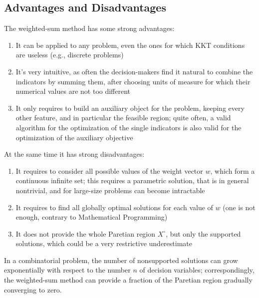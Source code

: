 \subsection{Advantages and Disadvantages}
\label{subsec:wsprocons}

The weighted-sum method has some strong advantages: 
\begin{enumerate}
	\item It can be applied to any problem, even the ones for which KKT conditions are useless (e.g., discrete problems)
	
	\item It's very intuitive, as often the decision-makers find it natural to combine the indicators by summing them, after choosing units of measure for which their numerical values are not too different
	
	\item It only requires to build an auxiliary object for the problem, keeping every other feature, and in particular the feasible region; quite often, a valid algorithm for the optimization of the single indicators is also valid for the optimization of the auxiliary objective
\end{enumerate}

At the same time it has strong disadvantages:
\begin{enumerate}
	\item It requires to consider all possible values of the weight vector $w$, which form a continuous infinite set; this requires a parametric solution, that is in general nontrivial, and for large-size problems can become intractable
	
	\item It requires to find all globally optimal solutions for each value of $w$ (one is not enough, contrary to Mathematical Programming)
	
	\item It does not provide the whole Paretian region $X^\circ$, but only the supported solutions, which could be a very restrictive underestimate \\
\end{enumerate}

\begin{theo}
	In a combinatorial problem, the number of nonsupported solutions can grow exponentially with respect to the number $n$ of decision variables; correspondingly, the weighted-sum method can provide a fraction of the Paretian region gradually converging to zero.
\end{theo}

